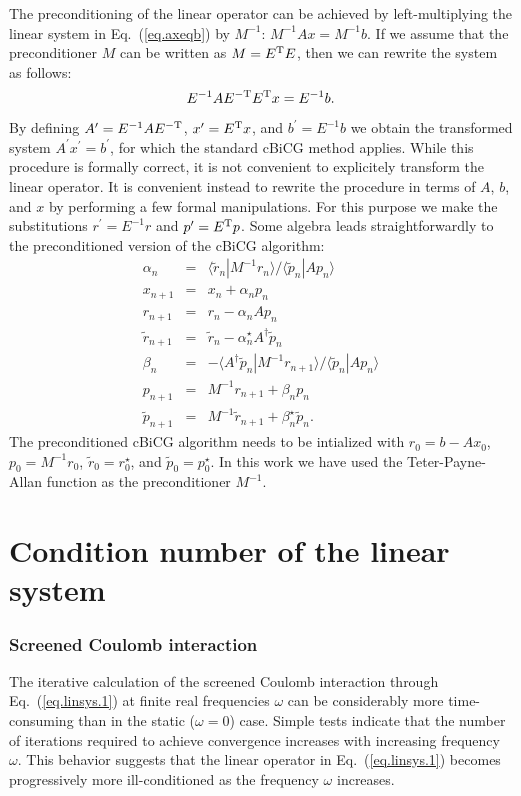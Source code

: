 \documentclass[twocolumn,prb,showpacs,superscriptaddress]{revtex4}
\def\w{\omega}
\def\>{\rangle}
\def\<{\langle}
\def\rt{\tilde{r}}
\def\pt{\tilde{p}}
\begin{document}
The preconditioning of the linear operator can be achieved by left-multiplying the linear system 
in Eq.\ (\ref{eq.axeqb}) 
by $M^{-1}$: $M^{-1}Ax=M^{-1}b$. If we assume that the preconditioner $M$ can be 
written as $M=E^{\rm T}E$, then we can rewrite the system as follows:
  \begin{equation}
  E^{-1}AE^{-{\rm T}} E^{\rm T}x = E^{-1}b.
  \end{equation}
By defining $A^\prime=E^{-1}AE^{-{\rm T}}$, $x^\prime=E^{\rm T}x$, and $b^\prime=E^{-1}b$
we obtain the transformed system $A^\prime x^\prime=b^\prime$, for which the
standard cBiCG method applies.
While this procedure is formally correct, it is not convenient to explicitely
transform the linear operator.
It is convenient instead to rewrite the procedure in terms of
$A$, $b$, and $x$ by performing a few formal manipulations.
For this purpose we make the substitutions
$r^\prime = E^{-1}r$ and $p^\prime=E^{\rm T} p$. Some algebra leads straightforwardly
to the preconditioned version of the cBiCG algorithm:
  \begin{eqnarray}
  \alpha_n & = & \<\rt_n|M^{-1}r_n\>/\<\pt_n|Ap_n\>  \\
  x_{n+1} & = & x_n + \alpha_n p_n \\ 
  r_{n+1} & = & r_n - \alpha_n Ap_n \\ 
  \rt_{n+1} & = & \rt_n - \alpha_n^\star A^\dagger \pt_n \\ 
  \beta_n & = & - \<A^\dagger\pt_n|M^{-1}r_{n+1}\>/\<\pt_n|Ap_n\> \\ 
  p_{n+1} & = & M^{-1}r_{n+1} + \beta_n p_n \\ 
  \pt_{n+1} & = & M^{-1}\rt_{n+1} + \beta_n^\star \pt_n.
  \end{eqnarray}
The preconditioned  cBiCG algorithm needs to be intialized with
$r_0=b-Ax_0$, $p_0=M^{-1}r_0$, $\rt_0=r_0^\star$, and $\pt_0=p_0^\star$.
In this work we have used the Teter-Payne-Allan function as the preconditioner 
$M^{-1}$.\cite{tpa}

\section{Condition number of the linear system}\label{app.condition}

\subsubsection{Screened Coulomb interaction}

The iterative calculation of the screened Coulomb interaction through 
Eq.\ (\ref{eq.linsys.1}) at finite real
frequencies $\w$ can be considerably more time-consuming than in the static
($\w\!=\!0$) case. Simple tests indicate that 
the number of iterations required to achieve convergence increases with 
increasing frequency $\w$. This behavior suggests that the linear operator in
Eq.\ (\ref{eq.linsys.1}) becomes progressively more ill-conditioned 
as the frequency $\w$ increases.
\end{document}
